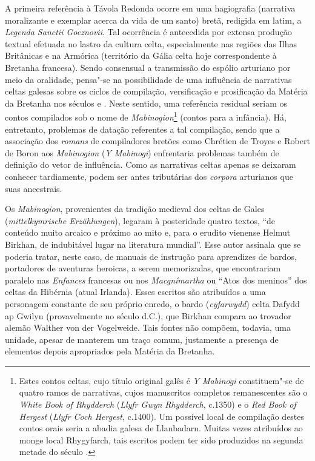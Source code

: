 A primeira referência à Távola Redonda ocorre em uma hagiografia (narrativa
moralizante e exemplar acerca da vida de um santo) bretã, redigida em latim, a
\textit{Legenda Sanctii Goeznovii}. Tal ocorrência é antecedida por extensa
produção textual efetuada no lastro da cultura celta, especialmente nas regiões
das Ilhas Britânicas e na Armórica (território da Gália celta hoje
correspondente à Bretanha francesa). Sendo consensual a transmissão do espólio
arturiano por meio da oralidade, pensa"-se na possibilidade de uma influência de
narrativas celtas galesas sobre os ciclos de compilação, versificação e
prosificação da Matéria da Bretanha nos séculos  e . Neste sentido, uma
referência residual seriam os contos compilados sob o nome de
\textit{Mabinogion}\footnote{ Estes contos celtas, cujo título original galês é
	\textit{Y Mabinogi} constituem"-se de quatro ramos de narrativas, cujos
	manuscritos completos remanescentes são o \textit{White Book of Rhydderch}
	(\textit{Llyfr Gwyn Rhydderch}, c.1350) e o \textit{Red Book of Hergest}
	(\textit{Llyfr Coch Hergest}, c.1400). Um possível local de compilação destes
	contos orais seria a abadia galesa de Llanbadarn. Muitas vezes atribuídos ao
	monge local Rhygyfarch, tais escritos podem ter sido produzidos na segunda
	metade do século .} 
(contos para a infância). Há, entretanto, problemas de
datação referentes a tal compilação, sendo que a associação dos
\textit{romans} de compiladores bretões como Chrétien de Troyes e Robert de Boron
aos \textit{Mabinogion} (\textit{Y Mabinogi}) enfrentaria problemas também de
definição do vetor de influência. Como as narrativas celtas apenas se deixaram
conhecer tardiamente, podem ser antes tributárias dos \textit{corpora}
arturianos que suas ancestrais.

Os \textit{Mabinogion}, provenientes da tradição medieval dos celtas de Gales
(\textit{mittelkymrische Erzählungen}), legaram à posteridade quatro textos,
“de conteúdo muito arcaico e próximo ao mito e, para o erudito vienense Helmut
Birkhan, de indubitável lugar na literatura mundial”. Esse autor assinala que
se poderia tratar, neste caso, de manuais de instrução para aprendizes de
bardos, portadores de aventuras heroicas, a serem memorizadas, que encontrariam
paralelo nas \textit{Enfances }francesas ou nos \textit{Macgnímartha} ou “Atos
dos meninos” dos celtas da Hibérnia (atual Irlanda). Esses escritos são atribuídos a uma
personagem constante de seu próprio enredo, o bardo (\textit{cyfarwydd}) celta
Dafydd ap Gwilyn (provavelmente no século  d.C.), que Birkhan compara ao
trovador alemão Walther von der Vogelweide. Tais fontes não compõem, todavia,
uma unidade, apesar de manterem um traço comum, justamente a presença de
elementos depois apropriados pela Matéria da Bretanha. 

